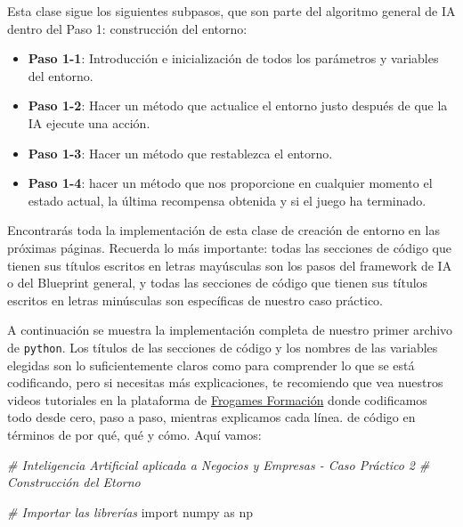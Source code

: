 \documentclass[
]{book}
\newenvironment{Shaded}{\begin{snugshade}}{\end{snugshade}}
\newcommand{\CommentTok}[1]{\textcolor[rgb]{0.56,0.35,0.01}{\textit{#1}}}
\newcommand{\ImportTok}[1]{#1}
\newcommand{\NormalTok}[1]{#1}
\providecommand{\tightlist}{%
  \setlength{\itemsep}{0pt}\setlength{\parskip}{0pt}}
\begin{document}
Esta clase sigue los siguientes subpasos, que son parte del algoritmo general de IA dentro del Paso 1: construcción del entorno:

\begin{itemize}
\tightlist
\item
  \textbf{Paso 1-1}: Introducción e inicialización de todos los parámetros y variables del entorno.
\item
  \textbf{Paso 1-2}: Hacer un método que actualice el entorno justo después de que la IA ejecute una acción.
\item
  \textbf{Paso 1-3}: Hacer un método que restablezca el entorno.
\item
  \textbf{Paso 1-4}: hacer un método que nos proporcione en cualquier momento el estado actual, la última recompensa obtenida y si el juego ha terminado.
\end{itemize}

Encontrarás toda la implementación de esta clase de creación de entorno en las próximas páginas. Recuerda lo más importante: todas las secciones de código que tienen sus títulos escritos en letras mayúsculas son los pasos del framework de IA o del Blueprint general, y todas las secciones de código que tienen sus títulos escritos en letras minúsculas son específicas de nuestro caso práctico.

A continuación se muestra la implementación completa de nuestro primer archivo de \texttt{python}. Los títulos de las secciones de código y los nombres de las variables elegidas son lo suficientemente claros como para comprender lo que se está codificando, pero si necesitas más explicaciones, te recomiendo que vea nuestros videos tutoriales en la plataforma de \href{https://cursos.frogamesformacion.com/courses/ia-aplicada-negocios?et=paid\&ref=846b3f\&coupon=frogames30}{Frogames Formación} donde codificamos todo desde cero, paso a paso, mientras explicamos cada línea. de código en términos de por qué, qué y cómo. Aquí vamos:

\begin{Shaded}
\begin{Highlighting}[]
\CommentTok{\# Inteligencia Artificial aplicada a Negocios y Empresas {-} Caso Práctico 2}
\CommentTok{\# Construcción del Etorno}

\CommentTok{\# Importar las librerías}
\ImportTok{import}\NormalTok{ numpy }\ImportTok{as}\NormalTok{ np}
\end{Highlighting}
\end{Shaded}
\end{document}
